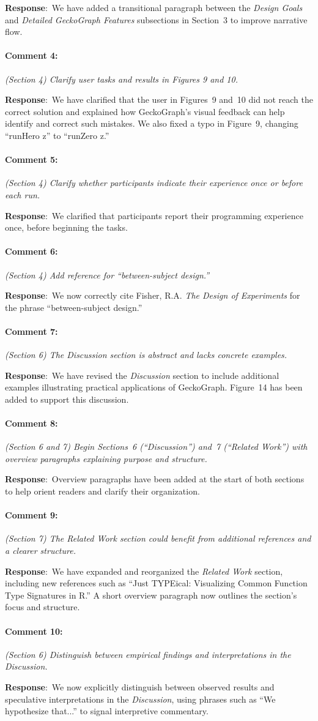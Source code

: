 \documentclass{article}
\newcommand{\pointRaised}[2]{\medskip \noindent 
               \paragraph{#1} \textsl{#2}}
\newcommand{\reply}{\noindent \textbf{Response}:\ }
\begin{document}
\reply We have added a transitional paragraph between the \textit{Design Goals} and \textit{Detailed GeckoGraph Features} subsections in Section~3 to improve narrative flow.

\pointRaised{Comment 4:}{(Section 4) Clarify user tasks and results in Figures 9 and 10.}

\reply We have clarified that the user in Figures~9 and~10 did not reach the correct solution and explained how GeckoGraph’s visual feedback can help identify and correct such mistakes. We also fixed a typo in Figure~9, changing “runHero z” to “runZero z.”

\pointRaised{Comment 5:}{(Section 4) Clarify whether participants indicate their experience once or before each run.}

\reply We clarified that participants report their programming experience once, before beginning the tasks.

\pointRaised{Comment 6:}{(Section 4) Add reference for “between-subject design.”}

\reply We now correctly cite Fisher, R.A. \textit{The Design of Experiments} for the phrase “between-subject design.”

\pointRaised{Comment 7:}{(Section 6) The Discussion section is abstract and lacks concrete examples.}

\reply We have revised the \textit{Discussion} section to include additional examples illustrating practical applications of GeckoGraph. Figure~14 has been added to support this discussion.

\pointRaised{Comment 8:}{(Section 6 and 7) Begin Sections~6 (“Discussion”) and~7 (“Related Work”) with overview paragraphs explaining purpose and structure.}

\reply Overview paragraphs have been added at the start of both sections to help orient readers and clarify their organization.

\pointRaised{Comment 9:}{(Section 7) The Related Work section could benefit from additional references and a clearer structure.}

\reply We have expanded and reorganized the \textit{Related Work} section, including new references such as “Just TYPEical: Visualizing Common Function Type Signatures in R.” A short overview paragraph now outlines the section’s focus and structure.

\pointRaised{Comment 10:}{(Section 6) Distinguish between empirical findings and interpretations in the Discussion.}

\reply We now explicitly distinguish between observed results and speculative interpretations in the \textit{Discussion}, using phrases such as “We hypothesize that...” to signal interpretive commentary.
\end{document}
